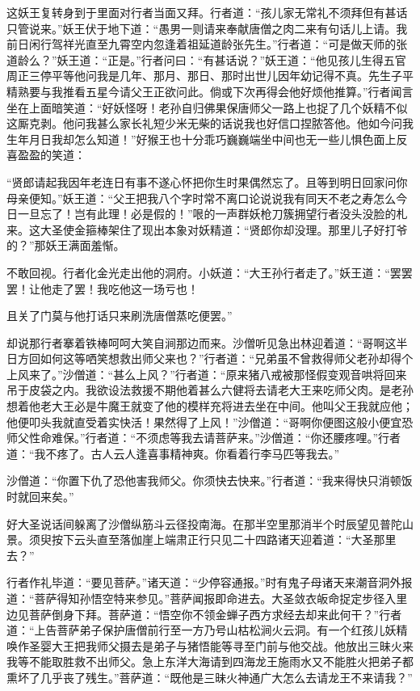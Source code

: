 \documentclass[12pt,UTF8]{ctexbook}
\begin{document}
{这妖王复转身到于里面对行者当面又拜。行者道：“孩儿家无常礼不须拜但有甚话只管说来。”妖王伏于地下道：“愚男一则请来奉献唐僧之肉二来有句话儿上请。我前日闲行驾祥光直至九霄空内忽逢着祖延道龄张先生。”行者道：“可是做天师的张道龄么？”妖王道：“正是。”行者问曰：“有甚话说？”妖王道：“他见孩儿生得五官周正三停平等他问我是几年、那月、那日、那时出世儿因年幼记得不真。先生子平精熟要与我推看五星今请父王正欲问此。倘或下次再得会他好烦他推算。”行者闻言坐在上面暗笑道：“好妖怪呀！老孙自归佛果保唐师父一路上也捉了几个妖精不似这厮克剥。他问我甚么家长礼短少米无柴的话说我也好信口捏脓答他。他如今问我生年月日我却怎么知道！”好猴王也十分乖巧巍巍端坐中间也无一些儿惧色面上反喜盈盈的笑道：

“贤郎请起我因年老连日有事不遂心怀把你生时果偶然忘了。且等到明日回家问你母亲便知。”妖王道：“父王把我八个字时常不离口论说说我有同天不老之寿怎么今日一旦忘了！岂有此理！必是假的！”哏的一声群妖枪刀簇拥望行者没头没脸的札来。这大圣使金箍棒架住了现出本象对妖精道：“贤郎你却没理。那里儿子好打爷的？”那妖王满面羞惭。

不敢回视。行者化金光走出他的洞府。小妖道：“大王孙行者走了。”妖王道：“罢罢罢！让他走了罢！我吃他这一场亏也！

且关了门莫与他打话只来刷洗唐僧蒸吃便罢。”

却说那行者搴着铁棒呵呵大笑自涧那边而来。沙僧听见急出林迎着道：“哥啊这半日方回如何这等哂笑想救出师父来也？”行者道：“兄弟虽不曾救得师父老孙却得个上风来了。”沙僧道：“甚么上风？”行者道：“原来猪八戒被那怪假变观音哄将回来吊于皮袋之内。我欲设法救援不期他着甚么六健将去请老大王来吃师父肉。是老孙想着他老大王必是牛魔王就变了他的模样充将进去坐在中间。他叫父王我就应他；他便叩头我就直受着实快活！果然得了上风！”沙僧道：“哥啊你便图这般小便宜恐师父性命难保。”行者道：“不须虑等我去请菩萨来。”沙僧道：“你还腰疼哩。”行者道：“我不疼了。古人云人逢喜事精神爽。你看着行李马匹等我去。”

沙僧道：“你置下仇了恐他害我师父。你须快去快来。”行者道：“我来得快只消顿饭时就回来矣。”

好大圣说话间躲离了沙僧纵筋斗云径投南海。在那半空里那消半个时辰望见普陀山景。须臾按下云头直至落伽崖上端肃正行只见二十四路诸天迎着道：“大圣那里去？”

行者作礼毕道：“要见菩萨。”诸天道：“少停容通报。”时有鬼子母诸天来潮音洞外报道：“菩萨得知孙悟空特来参见。”菩萨闻报即命进去。大圣敛衣皈命捉定步径入里边见菩萨倒身下拜。菩萨道：“悟空你不领金蝉子西方求经去却来此何干？”行者道：“上告菩萨弟子保护唐僧前行至一方乃号山枯松涧火云洞。有一个红孩儿妖精唤作圣婴大王把我师父摄去是弟子与猪悟能等寻至门前与他交战。他放出三昧火来我等不能取胜救不出师父。急上东洋大海请到四海龙王施雨水又不能胜火把弟子都熏坏了几乎丧了残生。”菩萨道：“既他是三昧火神通广大怎么去请龙王不来请我？”

}
\end{document}
